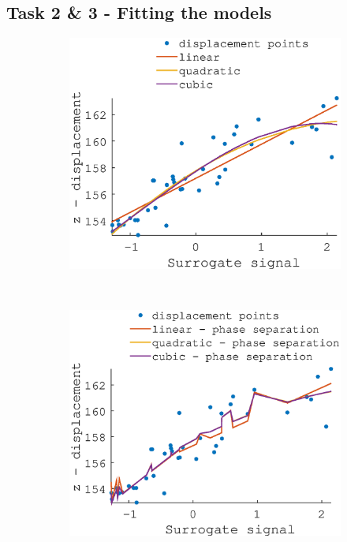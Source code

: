 \documentclass[11pt,a4paper,oneside]{report}
\begin{document}
\subsection*{Task 2 \& 3 - Fitting the models}

\begin{figure}
  \centering
  \hspace*{-2em}
  \begin{subfigure}[b]{0.33\textwidth}
    \includegraphics[width=\textwidth]{figures/task2/fit_round1_couch1.eps}
  \end{subfigure}%
    ~ %
  \begin{subfigure}[b]{0.33\textwidth}
    \includegraphics[width=\textwidth]{figures/task2/fit_round2_couch1.eps}

\end{subfigure}
\end{figure}
\end{document}
